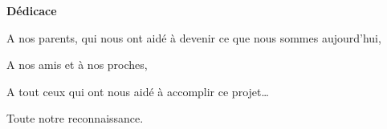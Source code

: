 \thispagestyle{empty}
\begin{center}
\LARGE\textbf{Dédicace}
\end{center}

\large
\noindent
A nos parents, qui nous ont aidé à devenir ce que nous sommes aujourd’hui,\par
\vspace{12pt}
\noindent
A nos amis et à nos proches,\par
\vspace{12pt}
\noindent
A tout ceux qui ont nous aidé à accomplir ce projet…\par
\vspace{12pt}
\noindent
Toute notre reconnaissance.

\newpage
